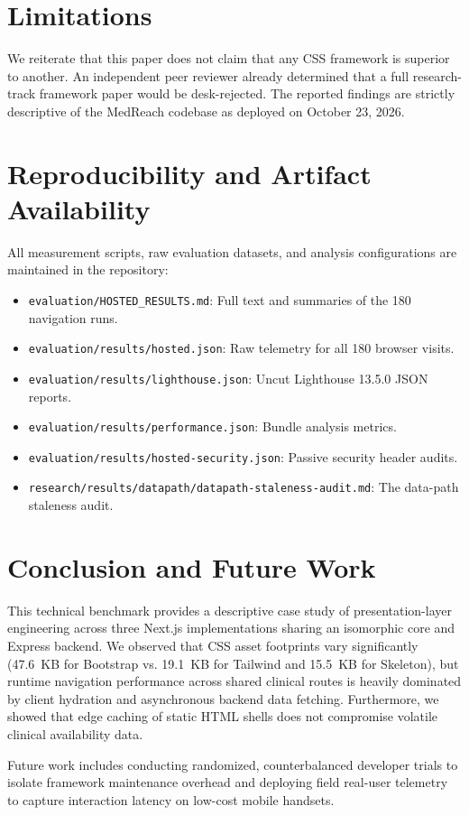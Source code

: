 \documentclass[conference]{IEEEtran}
\begin{document}
\section{Limitations}
We reiterate that this paper does not claim that any CSS framework is superior to another. An independent peer reviewer already determined that a full research-track framework paper would be desk-rejected. The reported findings are strictly descriptive of the MedReach codebase as deployed on October 23, 2026.

\section{Reproducibility and Artifact Availability}
All measurement scripts, raw evaluation datasets, and analysis configurations are maintained in the repository:
\begin{itemize}
    \item \texttt{evaluation/HOSTED\_RESULTS.md}: Full text and summaries of the 180 navigation runs.
    \item \texttt{evaluation/results/hosted.json}: Raw telemetry for all 180 browser visits.
    \item \texttt{evaluation/results/lighthouse.json}: Uncut Lighthouse 13.5.0 JSON reports.
    \item \texttt{evaluation/results/performance.json}: Bundle analysis metrics.
    \item \texttt{evaluation/results/hosted-security.json}: Passive security header audits.
    \item \texttt{research/results/datapath/datapath-staleness-audit.md}: The data-path staleness audit.
\end{itemize}

\section{Conclusion and Future Work}
This technical benchmark provides a descriptive case study of presentation-layer engineering across three Next.js implementations sharing an isomorphic core and Express backend. We observed that CSS asset footprints vary significantly (47.6~KB for Bootstrap vs. 19.1~KB for Tailwind and 15.5~KB for Skeleton), but runtime navigation performance across shared clinical routes is heavily dominated by client hydration and asynchronous backend data fetching. Furthermore, we showed that edge caching of static HTML shells does not compromise volatile clinical availability data.

Future work includes conducting randomized, counterbalanced developer trials to isolate framework maintenance overhead and deploying field real-user telemetry to capture interaction latency on low-cost mobile handsets.



\end{document}
